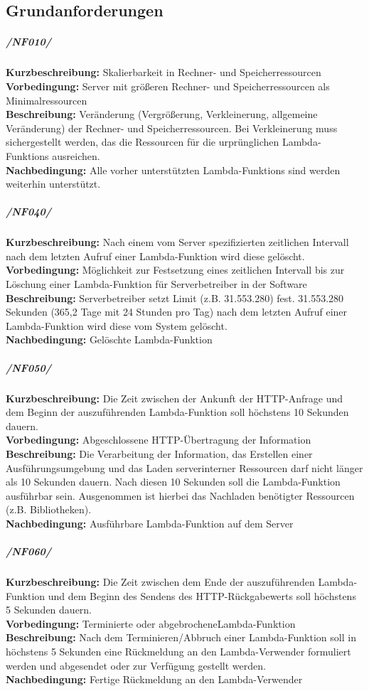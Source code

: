 \documentclass[a4paper,20pt,oneside]{book}
\begin{document}
\subsection{Grundanforderungen}
\subparagraph{/NF010/}
\textbf{Kurzbeschreibung:} Skalierbarkeit in Rechner- und Speicherressourcen
\\
\textbf{Vorbedingung:} Server mit größeren Rechner- und Speicherressourcen als Minimalressourcen
\\
\textbf{Beschreibung:} Veränderung (Vergrößerung, Verkleinerung, allgemeine Veränderung) der Rechner- und Speicherressourcen. Bei Verkleinerung muss sichergestellt werden, das die Ressourcen für die urprünglichen \glspl{Lambda-Funktion} ausreichen.
\\
\textbf{Nachbedingung:} Alle vorher unterstützten \glspl{Lambda-Funktion} sind werden weiterhin unterstützt.

\subparagraph{/NF040/}
\textbf{Kurzbeschreibung:} Nach einem vom Server spezifizierten zeitlichen Intervall nach dem letzten Aufruf einer \gls{Lambda-Funktion} wird diese gelöscht. 
\\
\textbf{Vorbedingung:} Möglichkeit zur Festsetzung eines zeitlichen Intervall bis zur Löschung einer \gls{Lambda-Funktion} für \gls{Serverbetreiber} in der Software
\\
\textbf{Beschreibung:} \gls{Serverbetreiber} setzt Limit (z.B. 31.553.280) fest. 31.553.280 Sekunden (365,2 Tage mit 24 Stunden pro Tag) nach dem letzten Aufruf einer \Gls{Lambda-Funktion} wird diese vom System gelöscht.
\\
\textbf{Nachbedingung:} Gelöschte Lambda-Funktion


\subparagraph{/NF050/}
\textbf{Kurzbeschreibung:} Die Zeit zwischen der Ankunft der HTTP-Anfrage und dem Beginn der auszuführenden \gls{Lambda-Funktion} soll höchstens 10 Sekunden dauern. 
\\
\textbf{Vorbedingung:} Abgeschlossene HTTP-Übertragung der Information 
\\
\textbf{Beschreibung:} Die Verarbeitung der Information, das Erstellen einer Ausführungsumgebung und das Laden serverinterner Ressourcen darf nicht länger als 10 Sekunden dauern. Nach diesen 10 Sekunden soll die \gls{Lambda-Funktion} ausführbar sein. Ausgenommen ist hierbei das Nachladen benötigter Ressourcen (z.B. Bibliotheken).
\\
\textbf{Nachbedingung:} Ausführbare \gls{Lambda-Funktion} auf dem Server


\subparagraph{/NF060/}
\textbf{Kurzbeschreibung:} Die Zeit zwischen dem Ende der auszuführenden \gls{Lambda-Funktion} und dem Beginn des Sendens des HTTP-Rückgabewerts soll höchstens 5 Sekunden dauern. 
\\
\textbf{Vorbedingung:} Terminierte oder abgebrochene\gls{Lambda-Funktion}
\\
\textbf{Beschreibung:} Nach dem Terminieren/Abbruch einer \gls{Lambda-Funktion} soll in höchstens 5 Sekunden eine Rückmeldung an den \gls{Lambda-Verwender} formuliert werden und abgesendet oder zur Verfügung gestellt werden.
\\
\textbf{Nachbedingung:} Fertige Rückmeldung an den \gls{Lambda-Verwender}
\end{document}

